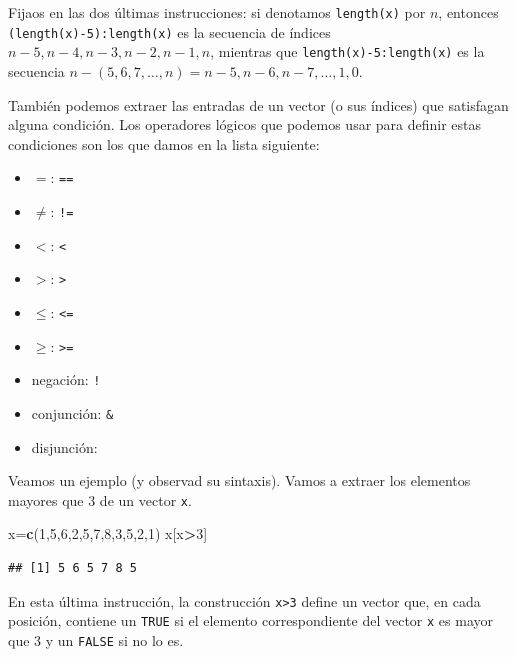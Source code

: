 \documentclass[]{book}
\newenvironment{Shaded}{\begin{snugshade}}{\end{snugshade}}
\newcommand{\DecValTok}[1]{\textcolor[rgb]{0.00,0.00,0.81}{#1}}
\newcommand{\KeywordTok}[1]{\textcolor[rgb]{0.13,0.29,0.53}{\textbf{#1}}}
\newcommand{\NormalTok}[1]{#1}
\newcommand{\OperatorTok}[1]{\textcolor[rgb]{0.81,0.36,0.00}{\textbf{#1}}}
\providecommand{\tightlist}{%
  \setlength{\itemsep}{0pt}\setlength{\parskip}{0pt}}
\theoremstyle{definition}
\theoremstyle{definition}
\theoremstyle{definition}
\theoremstyle{remark}
\begin{document}
Fijaos en las dos últimas instrucciones: si denotamos \texttt{length(x)} por \(n\), entonces
\texttt{(length(x)-5):length(x)} es la secuencia de índices
\(n-5, n-4, n-3, n-2, n-1, n\), mientras que \texttt{length(x)-5:length(x)} es la secuencia
\(n-(5, 6, 7, \ldots, n)=n-5, n-6, n-7, \ldots, 1, 0\).

También podemos extraer las entradas de un vector (o sus índices) que satisfagan alguna condición. Los operadores lógicos que podemos usar para definir estas condiciones son los que damos en la lista siguiente:

\begin{itemize}
\tightlist
\item
  \(=\): \texttt{==}
\item
  \(\neq\): \texttt{!=}
\item
  \(<\): \texttt{\textless{}}
\item
  \(>\): \texttt{\textgreater{}}
\item
  \(\leqslant\): \texttt{\textless{}=}
\item
  \(\geqslant\): \texttt{\textgreater{}=}
\item
  negación: \texttt{!}
\item
  conjunción: \texttt{\&}
\item
  disjunción: \texttt{\textbar{}}
\end{itemize}

Veamos un ejemplo (y observad su sintaxis). Vamos a extraer los elementos mayores que 3 de un vector \texttt{x}.

\begin{Shaded}
\begin{Highlighting}[]
\NormalTok{x=}\KeywordTok{c}\NormalTok{(}\DecValTok{1}\NormalTok{,}\DecValTok{5}\NormalTok{,}\DecValTok{6}\NormalTok{,}\DecValTok{2}\NormalTok{,}\DecValTok{5}\NormalTok{,}\DecValTok{7}\NormalTok{,}\DecValTok{8}\NormalTok{,}\DecValTok{3}\NormalTok{,}\DecValTok{5}\NormalTok{,}\DecValTok{2}\NormalTok{,}\DecValTok{1}\NormalTok{)}
\NormalTok{x[x}\OperatorTok{>}\DecValTok{3}\NormalTok{]}
\end{Highlighting}
\end{Shaded}

\begin{verbatim}
## [1] 5 6 5 7 8 5
\end{verbatim}

En esta última instrucción, la construcción \texttt{x\textgreater{}3} define un vector que, en cada posición, contiene un \texttt{TRUE} si el elemento correspondiente del vector \texttt{x} es mayor que 3 y un \texttt{FALSE} si no lo es.
\end{document}
